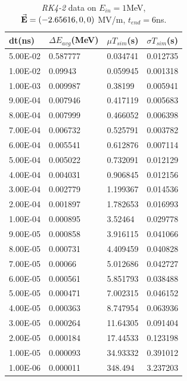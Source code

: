 \documentclass[a4paper,oneside,12pt]{report}
\numberwithin{equation}{chapter}
\begin{document}
{\begin{table}[H]
    \centering
    \caption{\textit{RK4-2} data on $E_{in}=1$MeV, $\vec{\textbf{E}}=(-2.65616, 0, 0)$ MV/m, $t_{end}=6$ns.}
    \vspace{10pt}
    \begin{tabular}{|l|l|l|l|}
    \hline
    dt(ns)       & $\Delta E_{avg}$(MeV) & $\mu T_{sim}$(s)    & $\sigma T_{sim}$(s) \\\hline
        5.00E-02 & 0.587777     & 0.034741 & 0.012735 \\\hline
        1.00E-02 & 0.09943      & 0.059945 & 0.001318 \\\hline
        1.00E-03 & 0.009987     & 0.38199  & 0.005941 \\\hline
        9.00E-04 & 0.007946     & 0.417119 & 0.005683 \\\hline
        8.00E-04 & 0.007999     & 0.466052 & 0.006398 \\\hline
        7.00E-04 & 0.006732     & 0.525791 & 0.003782 \\\hline
        6.00E-04 & 0.005541     & 0.612876 & 0.007114 \\\hline
        5.00E-04 & 0.005022     & 0.732091 & 0.012129 \\\hline
        4.00E-04 & 0.004031     & 0.906845 & 0.012156 \\\hline
        3.00E-04 & 0.002779     & 1.199367 & 0.014536 \\\hline
        2.00E-04 & 0.001897     & 1.782653 & 0.016993 \\\hline
        1.00E-04 & 0.000895     & 3.52464  & 0.029778 \\\hline
        9.00E-05 & 0.000858     & 3.916115 & 0.041066 \\\hline
        8.00E-05 & 0.000731     & 4.409459 & 0.040828 \\\hline
        7.00E-05 & 0.00066      & 5.012686 & 0.042727 \\\hline
        6.00E-05 & 0.000561     & 5.851793 & 0.038488 \\\hline
        5.00E-05 & 0.000471     & 7.002315 & 0.046152 \\\hline
        4.00E-05 & 0.000363     & 8.747954 & 0.063936 \\\hline
        3.00E-05 & 0.000264     & 11.64305 & 0.091404 \\\hline
        2.00E-05 & 0.000184     & 17.44533 & 0.123198 \\\hline
        1.00E-05 & 0.000093     & 34.93332 & 0.391012 \\\hline
        1.00E-06 & 0.000011     & 348.494  & 3.237203 \\\hline
    \end{tabular}
    \label{tab:rk2_statE90_table}
\end{table}


}
\end{document}
